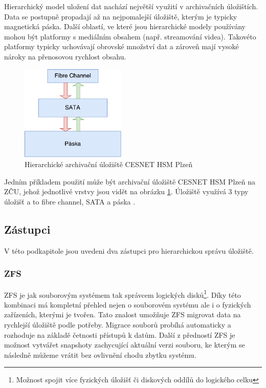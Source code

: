 \documentclass[czech,DP]{thesiskiv}
\begin{document}
Hierarchický model uložení dat nachází největší využití v archivačních úložištích. Data se postupně propadají až na nejpomalejší úložiště, kterým je typicky magnetická páska. Další oblastí, ve které jsou hierarchické modely používány mohou být platformy s mediálním obsahem (např. streamování videa). Takovéto platformy typicky uchovávají obrovské množství dat a zároveň mají vysoké nároky na přenosovou rychlost obsahu.

\begin{figure}
\centering
	\includegraphics[width=50mm]{img/hie_zcu.pdf}
\caption{Hierarchické archivační úložiště CESNET HSM Plzeň}
\label{fig:hie_zcu}
\end{figure}

Jedním příkladem použití může být archivační úložiště CESNET HSM Plzeň na ZČU, jehož jednotlivé vrstvy jsou vidět na obrázku \ref{fig:hie_zcu}. Úložiště využívá 3 typy úložišť a to fibre channel, SATA a páska \cite{cesnetstor}.

\subsection{Zástupci}

V této podkapitole jsou uvedeni dva zástupci pro hierarchickou správu úložiště.

\subsubsection*{ZFS}

ZFS \cite{zfspaper} je jak souborovým systémem tak správcem logických disků\footnote{Možnost spojit více fyzických úložišť či diskových oddílů do logického celku}. Díky této kombinaci má kompletní přehled nejen o souborovém systému ale i o fyzických zařízeních, kterými je tvořen. Tato znalost umožňuje ZFS migrovat data na rychlejší úložiště podle potřeby. Migrace souborů probíhá automaticky a rozhoduje na základě četnosti přístupů k datům. Další z předností ZFS je možnost vytvářet snapshoty zachycující aktuální verzi souboru, ke kterým se následně můžeme vrátit bez ovlivnění chodu zbytku systému. 
\end{document}
